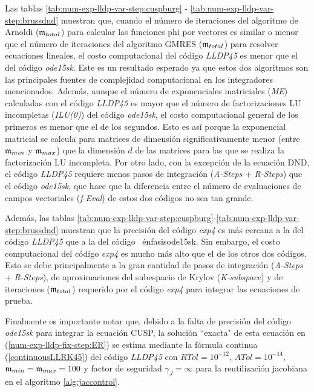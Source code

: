 Las tablas \ref{tab:num-exp-lldp-var-step:cuspburg} - \ref{tab:num-exp-lldp-var-step:brussdnd} muestran que, cuando el número de iteraciones del algoritmo de Arnoldi ($\mathfrak{m}_{total}$) para calcular las funciones phi por vectores es similar o menor que el número de iteraciones del algoritmo GMRES ($\mathfrak{m}_{total}$) para resolver ecuaciones lineales, el costo computacional del código \emph{LLDP45} es menor que el del código \emph{ode15sk}. Este es un resultado esperado ya que estos dos algoritmos son las principales fuentes de complejidad computacional en los integradores mencionados. Además, aunque el número de exponenciales matriciales (\textit{ME}) calculadas con el código \emph{LLDP45} es mayor que el número de factorizaciones LU incompletas (\textit{ILU(0)}) del código \emph{ode15sk}, el costo computacional general de los primeros es menor que el de los segundos. Esto es así porque la exponencial matricial se calcula para matrices de dimensión significativamente menor (entre $\mathfrak{m}_{min}$ y $\mathfrak{m}_{max}$) que la dimensión $d$ de las matrices para las que se realiza la factorización LU incompleta. Por otro lado, con la excepción de la ecuación DND, el código \emph{LLDP45} requiere menos pasos de integración (\textit{A-Steps} + \textit{R-Steps}) que el código \emph{ode15sk}, que hace que la diferencia entre el número de evaluaciones de campos vectoriales (\textit{f-Eval}) de estos dos códigos no sea tan grande.

Además, las tablas \ref{tab:num-exp-lldp-var-step:cuspburg}-\ref{tab:num-exp-lldp-var-step:brussdnd} muestran que la precisión del código \emph{exp4} es más cercana a la del código \emph{LLDP45} que a la del código \ énfasis{ode15sk}. Sin embargo, el costo computacional del código \emph{exp4} es mucho más alto que el de los otros dos códigos. Esto se debe principalmente a la gran cantidad de pasos de integración (\textit{A-Steps} + \textit{R-Steps}), de aproximaciones del subespacio de Krylov (\textit{K-subspace}) y de iteraciones ($\mathfrak{m}_ {total}$) requerido por el código \emph{exp4} para integrar las ecuaciones de prueba.

Finalmente es importante notar que, debido a la falta de precisión del código \emph{ode15sk} para integrar la ecuación CUSP, la solución ``exacta" de esta ecuación en (\ref{num-exp-lldp-fix-step:ER}) se estima mediante la fórmula continua (\ref{continuousLLRK45}) del código \emph{LLDP45} con $RTol = 10^{-12}$, $ATol = 10^{-14}$, $\mathfrak{m}_{min} = \mathfrak{m}_{max} = 100$ y factor de seguridad $\gamma_J=\infty$ para la reutilización jacobiana en el algoritmo \ref{alg:jaccontrol}.